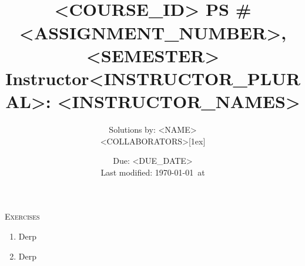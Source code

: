 \documentclass[11pt]{article}
\newcommand\0{\mathbf{0}}
\newcommand\<{\langle}
\renewcommand\>{\rangle}
\newcommand\1{\mathbbm{1}}
\begin{document}


\title{\mbox{}\\[-8ex]<COURSE_ID> PS \#<ASSIGNMENT_NUMBER>, <SEMESTER>\\\normalsize
	Instructor<INSTRUCTOR_PLURAL>: <INSTRUCTOR_NAMES>\\[-2.5ex]}
\author{Solutions by: <NAME>\\<COLLABORATORS>[1ex]}
\date{Due: <DUE_DATE>\\
Last modified: \today\, at \currenttime}

\maketitle

\vspace{-3ex}%

\noindent
\textsc{Exercises}

\begin{enumerate}
\item%
    Derp

\newpage
\item%
    Derp
\end{enumerate}

\end{document}
